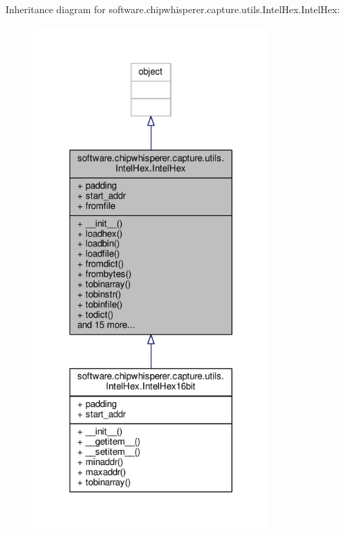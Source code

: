 Inheritance diagram for software.\+chipwhisperer.\+capture.\+utils.\+Intel\+Hex.\+Intel\+Hex\+:\nopagebreak
\begin{figure}[H]
\begin{center}
\leavevmode
\includegraphics[width=256pt]{d9/d7f/classsoftware_1_1chipwhisperer_1_1capture_1_1utils_1_1IntelHex_1_1IntelHex__inherit__graph}
\end{center}
\end{figure}


